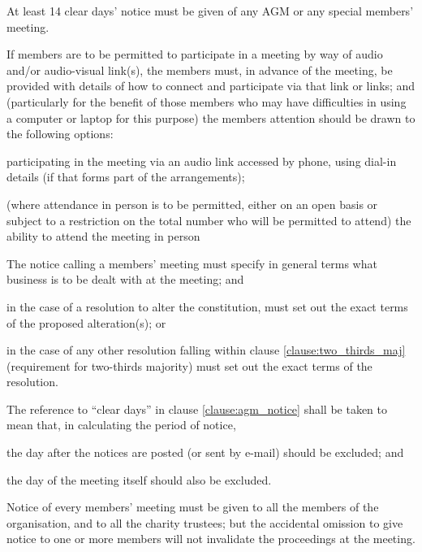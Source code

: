 ﻿\documentclass[a4paper,11pt,onecolumn ]{article}
\begin{document}
\begin{legal}
\item \label{clause:agm_notice} At least 14 clear days’ notice must be given of any AGM or any special members' meeting.
\item If members are to be permitted to participate in a meeting by way of audio and/or audio-visual link(s), the members must, in advance of the meeting, be provided with details of how to connect and participate via that link or links; and (particularly for the benefit of those members who may have difficulties in using a computer or laptop for this purpose) the members attention should be drawn to the following options:
    \begin{legal}[label=\alph*)]
    \item participating in the meeting via an audio link accessed by phone, using dial-in details (if that forms part of the arrangements);
    \item (where attendance in person is to be permitted, either on an open basis or subject to a restriction on the total number who will be permitted to attend) the ability to attend the meeting in person
    \end{legal}
\item The notice calling a members' meeting must specify in general terms what business is to be dealt with at the meeting; and
    \begin{legal}
    \item in the case of a resolution to alter the constitution, must set out the exact terms of the proposed alteration(s); or
    \item in the case of any other resolution falling within clause \ref{clause:two_thirds_maj} (requirement for two-thirds majority) must set out the exact terms of the resolution.
    \end{legal}
\item The reference to “clear days” in clause \ref{clause:agm_notice} shall be taken to mean that, in calculating the period of notice,
    \begin{legal}
        \item the day after the notices are posted (or sent by e-mail) should be excluded; and 
        \item the day of the meeting itself should also be excluded.
    \end{legal}
\item Notice of every members' meeting must be given to all the members of the organisation, and to all the charity trustees; but the accidental omission to give notice to one or more members will not invalidate the proceedings at the meeting.

\end{legal}
\end{document}
